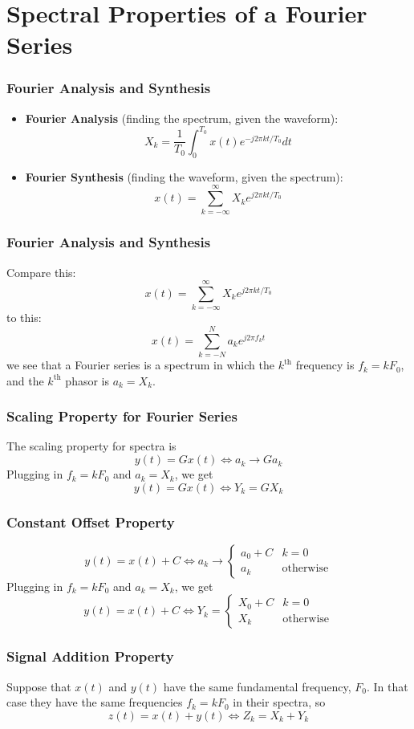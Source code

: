 \documentclass{beamer}
\begin{document}
\section[Fourier Series]{Spectral Properties of a Fourier Series}
\setcounter{subsection}{1}

\begin{frame}
  \frametitle{Fourier Analysis and Synthesis}
  \begin{itemize}
  \item {\bf Fourier Analysis}  (finding the spectrum, given the waveform):
    \[
    X_k = \frac{1}{T_0}\int_0^{T_0} x(t)e^{-j2\pi kt/T_0}dt
    \]
  \item {\bf Fourier Synthesis}  (finding the waveform, given the spectrum):
    \[
    x(t) = \sum_{k=-\infty}^\infty X_k e^{j2\pi kt/T_0}
    \]
  \end{itemize}
\end{frame}  

\begin{frame}
  \frametitle{Fourier Analysis and Synthesis}
  Compare this:
  \[
  x(t) = \sum_{k=-\infty}^\infty X_k e^{j2\pi kt/T_0}
  \]
  to this:
  \[
  x(t) = \sum_{k=-N}^N a_ke^{j2\pi f_kt}
  \]
  we see that a Fourier series is a spectrum in which the
  $k^{\textrm{th}}$ frequency is $f_k=kF_0$, and the $k^{\textrm{th}}$
  phasor is $a_k=X_k$.
\end{frame}  

\begin{frame}
  \frametitle{Scaling Property for Fourier Series}
  The scaling property for spectra is
  \[
  y(t) = Gx(t)\Leftrightarrow a_k \rightarrow Ga_k
  \]
  Plugging in $f_k=kF_0$ and $a_k=X_k$, we get
  \[
  y(t) = Gx(t) \Leftrightarrow Y_k = GX_k
  \]
\end{frame}

\begin{frame}
  \frametitle{Constant Offset Property}
  \[
  y(t)
  =x(t)+C
  \Leftrightarrow
  a_k \rightarrow
  \begin{cases}
    a_0+C&k=0\\
    a_k&\mbox{otherwise}
  \end{cases}
  \]
  Plugging in $f_k=kF_0$ and $a_k=X_k$, we get
  \[
  y(t)=x(t)+C\Leftrightarrow
  Y_k =
  \begin{cases}
    X_0+C&k=0\\
    X_k&\mbox{otherwise}
  \end{cases}
  \]
\end{frame}
\begin{frame}
  \frametitle{Signal Addition Property}

  Suppose that $x(t)$ and $y(t)$ have the same fundamental frequency, $F_0$.
  In that case they have the same frequencies $f_k=kF_0$ in their spectra, so
  \[
  z(t)=x(t)+y(t) \Leftrightarrow Z_k = X_k+Y_k
  \]
\end{frame}
\end{document}
